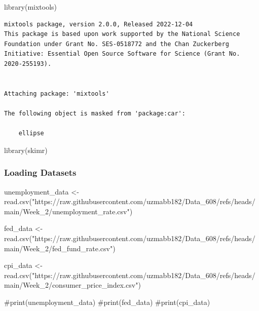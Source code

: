\documentclass[
  letterpaper,
  DIV=11,
  numbers=noendperiod]{scrartcl}
\newenvironment{Shaded}{\begin{snugshade}}{\end{snugshade}}
\newcommand{\CommentTok}[1]{\textcolor[rgb]{0.37,0.37,0.37}{#1}}
\newcommand{\FunctionTok}[1]{\textcolor[rgb]{0.28,0.35,0.67}{#1}}
\newcommand{\NormalTok}[1]{\textcolor[rgb]{0.00,0.23,0.31}{#1}}
\newcommand{\OtherTok}[1]{\textcolor[rgb]{0.00,0.23,0.31}{#1}}
\newcommand{\StringTok}[1]{\textcolor[rgb]{0.13,0.47,0.30}{#1}}
\begin{document}
\begin{Shaded}
\begin{Highlighting}[]
\FunctionTok{library}\NormalTok{(mixtools)}
\end{Highlighting}
\end{Shaded}

\begin{verbatim}
mixtools package, version 2.0.0, Released 2022-12-04
This package is based upon work supported by the National Science Foundation under Grant No. SES-0518772 and the Chan Zuckerberg Initiative: Essential Open Source Software for Science (Grant No. 2020-255193).


Attaching package: 'mixtools'

The following object is masked from 'package:car':

    ellipse
\end{verbatim}

\begin{Shaded}
\begin{Highlighting}[]
\FunctionTok{library}\NormalTok{(skimr)}
\end{Highlighting}
\end{Shaded}

\subsubsection{Loading Datasets}\label{loading-datasets}

\begin{Shaded}
\begin{Highlighting}[]
\NormalTok{unemployment\_data }\OtherTok{\textless{}{-}} \FunctionTok{read.csv}\NormalTok{(}\StringTok{"https://raw.githubusercontent.com/uzmabb182/Data\_608/refs/heads/main/Week\_2/unemployment\_rate.csv"}\NormalTok{)}

\NormalTok{fed\_data }\OtherTok{\textless{}{-}} \FunctionTok{read.csv}\NormalTok{(}\StringTok{"https://raw.githubusercontent.com/uzmabb182/Data\_608/refs/heads/main/Week\_2/fed\_fund\_rate.csv"}\NormalTok{)}

\NormalTok{cpi\_data }\OtherTok{\textless{}{-}} \FunctionTok{read.csv}\NormalTok{(}\StringTok{"https://raw.githubusercontent.com/uzmabb182/Data\_608/refs/heads/main/Week\_2/consumer\_price\_index.csv"}\NormalTok{)}

\CommentTok{\#print(unemployment\_data)}
\CommentTok{\#print(fed\_data)}
\CommentTok{\#print(cpi\_data)}
\end{Highlighting}
\end{Shaded}
\end{document}
